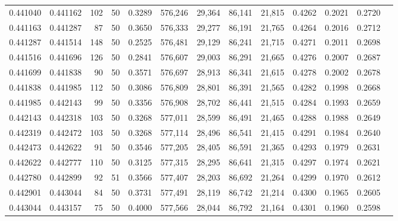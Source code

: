 \begin{tabular}{rrrrrrrrrrrrr}
0.441040 & 0.441162 &   102 &  50 &                                     0.3289 & 576,246 &  29,364 &  86,141 &  21,815 & 0.4262 & 0.2021 & 0.2720 \\
0.441163 & 0.441287 &    87 &  50 &                                     0.3650 & 576,333 &  29,277 &  86,191 &  21,765 & 0.4264 & 0.2016 & 0.2712 \\
0.441287 & 0.441514 &   148 &  50 &                                     0.2525 & 576,481 &  29,129 &  86,241 &  21,715 & 0.4271 & 0.2011 & 0.2698 \\
0.441516 & 0.441696 &   126 &  50 &                                     0.2841 & 576,607 &  29,003 &  86,291 &  21,665 & 0.4276 & 0.2007 & 0.2687 \\
0.441699 & 0.441838 &    90 &  50 &                                     0.3571 & 576,697 &  28,913 &  86,341 &  21,615 & 0.4278 & 0.2002 & 0.2678 \\
0.441838 & 0.441985 &   112 &  50 &                                     0.3086 & 576,809 &  28,801 &  86,391 &  21,565 & 0.4282 & 0.1998 & 0.2668 \\
0.441985 & 0.442143 &    99 &  50 &                                     0.3356 & 576,908 &  28,702 &  86,441 &  21,515 & 0.4284 & 0.1993 & 0.2659 \\
0.442143 & 0.442318 &   103 &  50 &                                     0.3268 & 577,011 &  28,599 &  86,491 &  21,465 & 0.4288 & 0.1988 & 0.2649 \\
0.442319 & 0.442472 &   103 &  50 &                                     0.3268 & 577,114 &  28,496 &  86,541 &  21,415 & 0.4291 & 0.1984 & 0.2640 \\
0.442473 & 0.442622 &    91 &  50 &                                     0.3546 & 577,205 &  28,405 &  86,591 &  21,365 & 0.4293 & 0.1979 & 0.2631 \\
0.442622 & 0.442777 &   110 &  50 &                                     0.3125 & 577,315 &  28,295 &  86,641 &  21,315 & 0.4297 & 0.1974 & 0.2621 \\
0.442780 & 0.442899 &    92 &  51 &                                     0.3566 & 577,407 &  28,203 &  86,692 &  21,264 & 0.4299 & 0.1970 & 0.2612 \\
0.442901 & 0.443044 &    84 &  50 &                                     0.3731 & 577,491 &  28,119 &  86,742 &  21,214 & 0.4300 & 0.1965 & 0.2605 \\
0.443044 & 0.443157 &    75 &  50 &                                     0.4000 & 577,566 &  28,044 &  86,792 &  21,164 & 0.4301 & 0.1960 & 0.2598 \\

\end{tabular}
